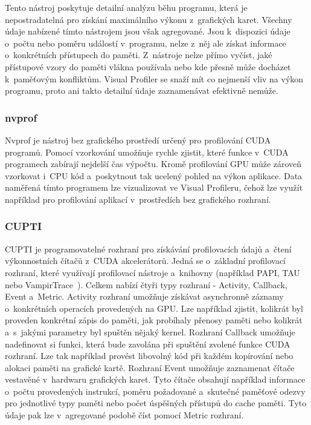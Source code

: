 Tento nástroj poskytuje detailní analýzu běhu programu, která je nepostradatelná pro získání maximálního výkonu z~grafických karet. Všechny údaje nabízené tímto nástrojem jsou však agregované. Jsou k~dispozici údaje o~počtu nebo poměru událostí v~programu, nelze z~něj ale získat informace o~konkrétních přístupech do paměti. Z~nástroje nelze přímo vyčíst, jaké přístupové vzory do paměti vlákna používala nebo kde přesně může docházet k~paměťovým konfliktům. 
Visual Profiler se snaží mít co nejmenší vliv na výkon programu, proto ani takto detailní údaje zaznamenávat efektivně nemůže.


\subsubsection{nvprof}
Nvprof je nástroj bez grafického prostředí určený pro profilování CUDA programů. Pomocí vzorkování umožňuje rychle zjistit, které funkce v~CUDA programech zabírají nejdelší čas výpočtu. Kromě profilování GPU může zároveň vzorkovat i~CPU kód a~poskytnout tak ucelený pohled na výkon aplikace. Data naměřená tímto programem lze vizualizovat ve Visual Profileru, čehož lze využít například pro profilování aplikací v~prostředích bez grafického rozhraní. 

\subsubsection{CUPTI}
CUPTI je programovatelné rozhraní pro získávání profilovacích údajů a~čtení výkonnostních čítačů z~CUDA akcelerátorů. Jedná se o~základní profilovací rozhraní, které využívají profilovací nástroje a~knihovny (například PAPI, TAU nebo VampirTrace~\cite{tau, vampir}).
Celkem nabízí čtyři typy rozhraní - Activity, Callback, Event a~Metric. Activity rozhraní umožňuje získávat asynchronně záznamy o~konkrétních operacích provedených na GPU. Lze například zjistit, kolikrát byl proveden konkrétní zápis do paměti, jak probíhaly přenosy paměti nebo kolikrát a~s~jakými parametry byl spuštěn nějaký kernel. Rozhraní Callback umožňuje nadefinovat si funkci, která bude zavolána při spuštění zvolené funkce CUDA rozhraní. Lze tak například provést libovolný kód při každém kopírování nebo alokaci paměti na grafické kartě. Rozhraní Event umožňuje zaznamenat čítače vestavěné v~hardwaru grafických karet. Tyto čítače obsahují například informace o~počtu provedených instrukcí, poměru požadované a~skutečné paměťové odezvy pro jednotlivé typy paměti nebo počet úspěšných přístupů do cache paměti. Tyto údaje pak lze v~agregované podobě číst pomocí Metric rozhraní.

